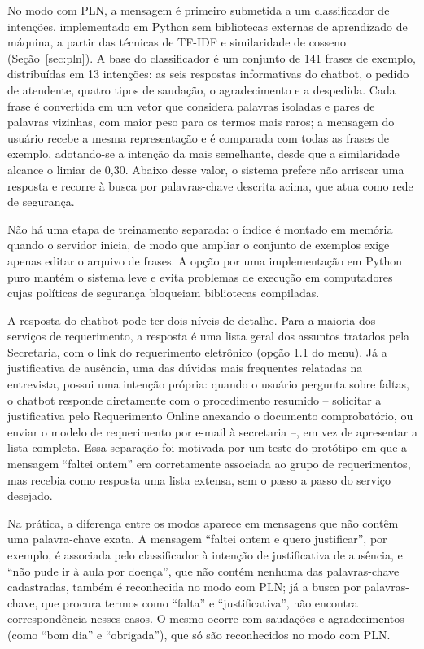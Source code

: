 \documentclass[12pt]{article}
\begin{document}
No modo com PLN, a mensagem é primeiro submetida a um classificador de
intenções, implementado em Python sem bibliotecas externas de aprendizado
de máquina, a partir das técnicas de TF-IDF e similaridade de cosseno
(Seção~\ref{sec:pln}). A base do classificador é um conjunto de 141 frases
de exemplo, distribuídas em 13 intenções: as seis respostas informativas
do chatbot, o pedido de atendente, quatro tipos de saudação, o
agradecimento e a despedida. Cada frase é convertida em um vetor que
considera palavras isoladas e pares de palavras vizinhas, com maior peso
para os termos mais raros; a mensagem do usuário recebe a mesma
representação e é comparada com todas as frases de exemplo, adotando-se a
intenção da mais semelhante, desde que a similaridade alcance o limiar de
0,30. Abaixo desse valor, o sistema prefere não arriscar uma resposta e
recorre à busca por palavras-chave descrita acima, que atua como rede de
segurança.

Não há uma etapa de treinamento separada: o índice é montado em memória
quando o servidor inicia, de modo que ampliar o conjunto de exemplos exige
apenas editar o arquivo de frases. A opção por uma implementação em Python
puro mantém o sistema leve e evita problemas de execução em computadores
cujas políticas de segurança bloqueiam bibliotecas compiladas.

A resposta do chatbot pode ter dois níveis de detalhe. Para a maioria dos
serviços de requerimento, a resposta é uma lista geral dos assuntos
tratados pela Secretaria, com o link do requerimento eletrônico (opção 1.1
do menu). Já a justificativa de ausência, uma das dúvidas mais frequentes
relatadas na entrevista, possui uma intenção própria: quando o usuário
pergunta sobre faltas, o chatbot responde diretamente com o procedimento
resumido -- solicitar a justificativa pelo Requerimento Online anexando o
documento comprobatório, ou enviar o modelo de requerimento por e-mail à
secretaria --, em vez de apresentar a lista completa. Essa separação foi
motivada por um teste do protótipo em que a mensagem ``faltei ontem'' era
corretamente associada ao grupo de requerimentos, mas recebia como
resposta uma lista extensa, sem o passo a passo do serviço desejado.

Na prática, a diferença entre os modos aparece em mensagens que não contêm
uma palavra-chave exata. A mensagem ``faltei ontem e quero justificar'', por
exemplo, é associada pelo classificador à intenção de justificativa de
ausência, e ``não pude ir à aula por doença'', que não contém nenhuma das
palavras-chave cadastradas, também é reconhecida no modo com PLN; já a
busca por palavras-chave, que procura termos como ``falta'' e
``justificativa'', não encontra correspondência nesses casos. O mesmo ocorre
com saudações e agradecimentos (como ``bom dia'' e ``obrigada''), que só são
reconhecidos no modo com PLN.
\end{document}
